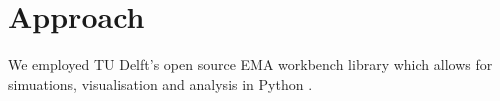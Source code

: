 \section{Approach}
\label{s:approach}



We employed TU Delft's open source EMA workbench library which allows for simuations, visualisation and analysis in Python \parencite{kwakkel_coping_2016}.